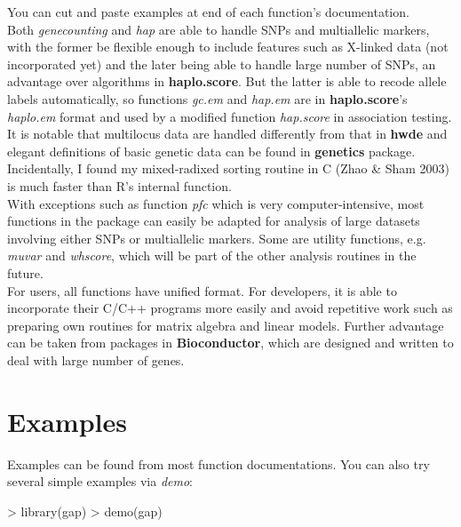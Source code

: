 \documentclass[10pt,a4paper]{article}
\begin{document}
You can cut and paste examples at end of each function's documentation.\\

Both \textit{genecounting} and \textit{hap} are able to handle SNPs and multiallelic
markers, with the former be flexible enough to include features such as X-linked data
(not incorporated yet) and the later being able to handle large number of SNPs, an
advantage over algorithms in {\bf haplo.score}. But the latter is able to recode
allele labels automatically, so functions \textit{gc.em} and \textit{hap.em}
are in {\bf haplo.score}'s \textit{haplo.em} format and used by a modified function
\textit{hap.score} in association testing.\\

It is notable that multilocus data are handled differently from that in {\bf hwde} and
elegant definitions of basic genetic data can be found in {\bf genetics} package.\\

Incidentally, I found my mixed-radixed sorting routine in C (Zhao \& Sham 2003) is much
faster than R's internal function.\\

With exceptions such as function \textit{pfc} which is very computer-intensive, most
functions in the package can easily be adapted for analysis of large datasets involving
either SNPs or multiallelic markers. Some are utility functions, e.g. \textit{muvar}
and \textit{whscore}, which will be part of the other analysis routines in the future.\\

For users, all functions have unified format. For developers, it is able to incorporate
their C/C++ programs more easily and avoid repetitive work such as preparing own routines
for matrix algebra and linear models. Further advantage can be taken from packages in
{\bf Bioconductor}, which are designed and written to deal with large number of genes.


\section{Examples}

Examples can be found from most function documentations. You can also try several simple
examples via \textit{demo}:

\begin{Schunk}
\begin{Sinput}
> library(gap)
> demo(gap)
\end{Sinput}
\end{Schunk}
\end{document}
